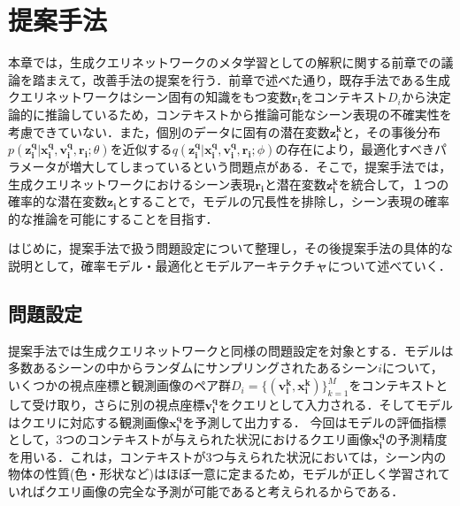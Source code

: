 \chapter{提案手法}
\label{chap:proposal}
本章では，生成クエリネットワークのメタ学習としての解釈に関する前章での議論を踏まえて，改善手法の提案を行う．前章で述べた通り，既存手法である生成クエリネットワークはシーン固有の知識をもつ変数$\bm{r_i}$をコンテキスト$D_i$から決定論的に推論しているため，コンテキストから推論可能なシーン表現の不確実性を考慮できていない．また，個別のデータに固有の潜在変数$\bm{z_i^k}$と，その事後分布$p(\bm{z_i^q}|\bm{x_i^q}, \bm{v_i^q}, \bm{r_i}; \theta)$を近似する$q(\bm{z_i^q}|\bm{x_i^q}, \bm{v_i^q}, \bm{r_i}; \phi)$の存在により，最適化すべきパラメータが増大してしまっているという問題点がある．そこで，提案手法では，生成クエリネットワークにおけるシーン表現$\bm{r_i}$と潜在変数$\bm{z_i^k}$を統合して，１つの確率的な潜在変数$\bm{z_i}$とすることで，モデルの冗長性を排除し，シーン表現の確率的な推論を可能にすることを目指す．

はじめに，提案手法で扱う問題設定について整理し，その後提案手法の具体的な説明として，確率モデル・最適化とモデルアーキテクチャについて述べていく．


\section{問題設定}
提案手法では生成クエリネットワークと同様の問題設定を対象とする．モデルは多数あるシーンの中からランダムにサンプリングされたあるシーン$i$について，いくつかの視点座標と観測画像のペア群$D_i = \{ ( \bm{v _ { i } ^ { k }} , \bm{x _ { i } ^ { k }} ) \} _ { k = 1 } ^ { M }$をコンテキストとして受け取り，さらに別の視点座標$\bm{v_i^q}$をクエリとして入力される．そしてモデルはクエリに対応する観測画像$\bm{x_i^q}$を予測して出力する．
今回はモデルの評価指標として，3つのコンテキストが与えられた状況におけるクエリ画像$\bm{x_i^q}$の予測精度を用いる．これは，コンテキストが3つ与えられた状況においては，シーン内の物体の性質(色・形状など)はほぼ一意に定まるため，モデルが正しく学習されていればクエリ画像の完全な予測が可能であると考えられるからである．

